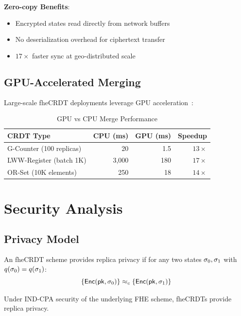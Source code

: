 \documentclass{../shared/luxfhe}
\begin{document}
\textbf{Zero-copy Benefits}:
\begin{itemize}[noitemsep]
    \item Encrypted states read directly from network buffers
    \item No deserialization overhead for ciphertext transfer
    \item $17\times$ faster sync at geo-distributed scale
\end{itemize}

\subsection{GPU-Accelerated Merging}

Large-scale fheCRDT deployments leverage GPU acceleration~\cite{luxcpp-fhe}:

\begin{table}[h]
\centering
\caption{GPU vs CPU Merge Performance}
\begin{tabular}{lrrr}
\toprule
CRDT Type & CPU (ms) & GPU (ms) & Speedup \\
\midrule
G-Counter (100 replicas) & 20 & 1.5 & $13\times$ \\
LWW-Register (batch 1K) & 3,000 & 180 & $17\times$ \\
OR-Set (10K elements) & 250 & 18 & $14\times$ \\
\bottomrule
\end{tabular}
\end{table}

\section{Security Analysis}

\subsection{Privacy Model}

\begin{definition}
An fheCRDT scheme provides replica privacy if for any two states $\sigma_0, \sigma_1$ with $q(\sigma_0) = q(\sigma_1)$:
\[
\{\mathsf{Enc}(\mathsf{pk}, \sigma_0)\} \approx_c \{\mathsf{Enc}(\mathsf{pk}, \sigma_1)\}
\]
\end{definition}

\begin{theorem}
Under IND-CPA security of the underlying FHE scheme, fheCRDTs provide replica privacy.
\end{theorem}
\end{document}
